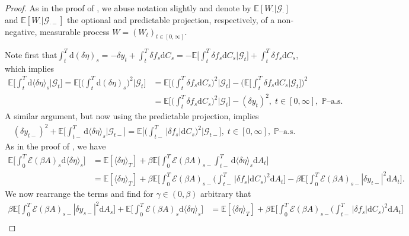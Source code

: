 \documentclass[10pt]{article} %
\newcommand\cE{\mathcal E}
\newcommand\cG{\mathcal G}
\def \E{\mathbb{E}}
\def \P{\mathbb{P}}
\newcommand{\1}{\mathbf{1}}
\def\d{\mathrm{d}}
\begin{document}
\begin{proof}
	As in the proof of , we abuse notation slightly and denote by $\E[W_\cdot| \cG_\cdot]$ and $\E[W_\cdot|\cG_{\cdot-}]$ the optional and predictable projection, respectively, of a non-negative, measurable process $W = (W_t)_{t \in [0,\infty]}$.
	
	\medskip
	Note first that$ \int_t^T \d(\delta\eta)_s = -\delta y_t + \int_t^T \delta f_s \d C_s = - \E\big[\int_t^T \delta f_s \d C_s \big| \cG_t\big] + \int_t^T \delta f_s \d C_s,$ which implies
	\begin{align}\label{eq::cond_delta_eta_bsde}
		\E\bigg[\int_t^T \d\langle\delta\eta\rangle_s\bigg|\cG_t\bigg] = \E\bigg[\bigg(\int_t^T \d(\delta\eta)_s\bigg)^2\bigg|\cG_t\bigg] &= \E\bigg[\bigg(\int_t^T \delta f_s \d C_s\bigg)^2 \bigg| \cG_t\bigg] - \bigg(\E\bigg[\int_t^T \delta f_s \d C_s \bigg| \cG_t\bigg]\bigg)^2 \nonumber\\
		&= \E\bigg[\bigg(\int_t^T \delta f_s \d C_s\bigg)^2 \bigg| \cG_t\bigg] - (\delta y_t)^2, \; t \in [0,\infty], \; \text{$\P$--a.s.}
	\end{align}
	A similar argument, but now using the predictable projection, implies
	\begin{align}\label{eq::cond_delta_eta_bsde_minus}
		(\delta y_{t-})^2 + \E\bigg[\int_{t-}^T \d\langle\delta\eta\rangle_s\bigg|\cG_{t-}\bigg] = \E\bigg[\bigg(\int_{t-}^T |\delta f_s| \d C_s\bigg)^2 \bigg| \cG_{t-}\bigg], \; t \in [0,\infty], \; \text{$\P$--a.s.}
	\end{align}
	As in the proof of , we have
	\begin{align*}
		\E\bigg[\int_0^T \cE(\beta A)_s \d \langle\delta\eta\rangle_s\bigg] 
		&= \E[\langle\delta\eta\rangle_T] + \beta \E\bigg[\int_0^T \cE(\beta A)_{s-}\int_{t-}^T \d\langle\delta\eta\rangle_s\d A_t\bigg] \\
		&= \E[\langle\delta\eta\rangle_T] + \beta \E\bigg[\int_0^T \cE(\beta A)_{s-}\bigg(\int_{t-}^T |\delta f_s|\d C_s\bigg)^2\d A_t\bigg] - \beta \E\bigg[\int_0^T \cE(\beta A)_{s-}|\delta y_{t-}|^2\d A_t\bigg].
	\end{align*}
	We now rearrange the terms and find for $\gamma \in (0,\beta)$ arbitrary that
	\begin{align*}
		\beta \E\bigg[\int_0^T \cE(\beta A)_{s-}|\delta y_{s-}|^2\d A_s\bigg] + \E\bigg[\int_0^T \cE(\beta A)_s \d \langle\delta\eta\rangle_s\bigg] 
		&= \E[\langle\delta\eta\rangle_T] + \beta \E\bigg[\int_0^T \cE(\beta A)_{s-}\bigg(\int_{t-}^T |\delta f_s|\d C_s\bigg)^2\d A_t\bigg] \\

\end{align*}
\end{proof}
\end{document}
